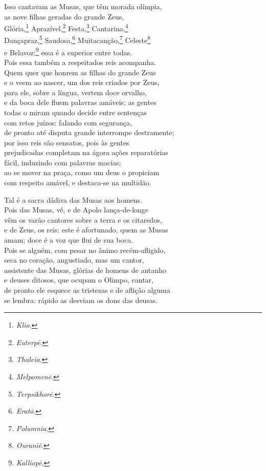 \quad{}Isso cantavam as Musas, que têm morada olímpia, \\
as nove filhas geradas do grande Zeus,\\
Glória,\footnote{\emph{Klio}.} Aprazível,\footnote{\emph{Euterpē}.} Festa,\footnote{\emph{Thaleia}.} Cantarina,\footnote{\emph{Melpomenē}.}\\
Dançapraz,\footnote{\emph{Terpsikhorē}.} Saudosa,\footnote{\emph{Eratō}.} Muitacanção,\footnote{\emph{Polumnia}.} Celeste\footnote{\emph{Ouraniē}.}\\
e Belavoz:\footnote{\emph{Kalliopē}.} essa é a superior entre todas.\\
Pois essa também a respeitados reis acompanha. \\
Quem quer que honrem as filhas do grande Zeus\\
e o veem ao nascer, um dos reis criados por Zeus,\\
para ele, sobre a língua, vertem doce orvalho,\\
e da boca dele fluem palavras amáveis; as gentes\\
todas o miram quando decide entre sentenças \\
com retos juízos: falando com segurança,\\
de pronto até disputa grande interrompe destramente;\\
por isso reis são sensatos, pois às gentes\\
prejudicadas completam na ágora ações reparatórias\\
fácil, induzindo com palavras macias; \\
ao se mover na praça, como um deus o propiciam\\
com respeito amável, e destaca-se na multidão.

\quad{}Tal é a sacra dádiva das Musas aos homens.\\
Pois das Musas, vê, e de Apolo lança-de-longe\\
vêm os varão cantores sobre a terra e os citaredos, \\
e de Zeus, os reis: este é afortunado, quem as Musas\\
amam; doce é a voz que flui de sua boca.\\
Pois se alguém, com pesar no ânimo recém-afligido,\\
seca no coração, angustiado, mas um cantor,\\
assistente das Musas, glórias de homens de antanho \\
e deuses ditosos, que ocupam o Olimpo, cantar,\\
de pronto ele esquece as tristezas e de aflição alguma\\
se lembra: rápido as desviam os dons das deusas.

